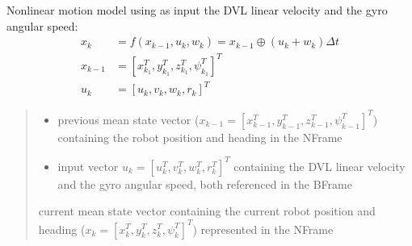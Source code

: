 \documentclass[letterpaper,10pt,english]{sphinxmanual}
\begin{document}
\begin{fulllineitems}
\begin{fulllineitems}
\label{\detokenize{GFLocalization:EKF_3DOFDifferentialDriveInputDisplacement.EKF_3DOFDifferentialDriveInputDisplacement.f}}
\pysigstartsignatures
{}
\pysigstopsignatures
\sphinxAtStartPar
Non\sphinxhyphen{}linear motion model using as input the DVL linear velocity and the gyro angular speed:
\begin{equation*}
\begin{split}x_k&=f(x_{k-1},u_k,w_k) = x_{k-1} \oplus (u_k + w_k) \Delta t \\
x_{k-1}&=[x_{k_1}^T, y_{k_1}^T, z_{k_1}^T, \psi_{k_1}^T]^T\\
u_k&=[u_k, v_k, w_k, r_k]^T\end{split}
\end{equation*}\begin{quote}\begin{description}
\begin{itemize}
\item {} 
\sphinxAtStartPar
{} \textendash{} previous mean state vector (\(x_{k-1}=[x_{k-1}^T, y_{k-1}^T, z_{k-1}^T, \psi_{k-1}^T]^T\)) containing the robot position and heading in the N\sphinxhyphen{}Frame

\item {} 
\sphinxAtStartPar
{} \textendash{} input vector \(u_k=[u_k^T, v_k^T, w_k^T, r_k^T]^T\) containing the DVL linear velocity and the gyro angular speed, both referenced in the B\sphinxhyphen{}Frame

\end{itemize}

\sphinxAtStartPar
current mean state vector containing the current robot position and heading (\(x_k=[x_k^T, y_k^T, z_k^T, \psi_k^T]^T\)) represented in the N\sphinxhyphen{}Frame

\end{description}\end{quote}

\end{fulllineitems}



\end{fulllineitems}
\end{document}
